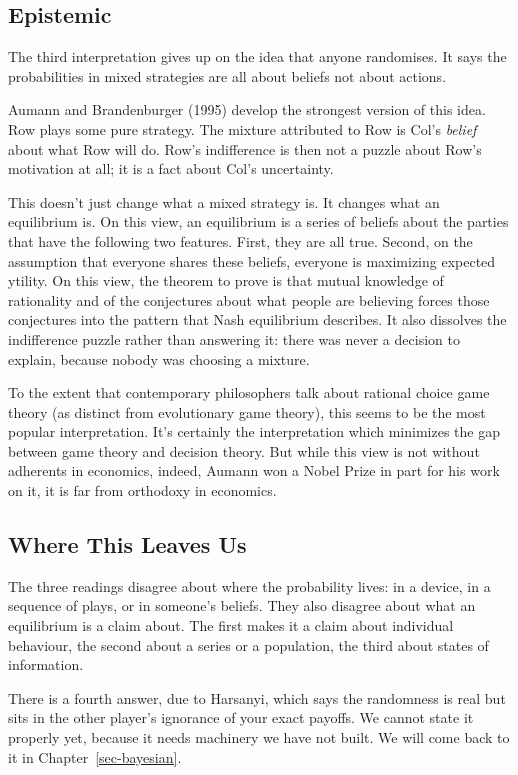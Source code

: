 \documentclass[
  11pt,
  letterpaper,
]{scrbook}
\begin{document}
\subsection{Epistemic}\label{epistemic}

The third interpretation gives up on the idea that anyone randomises. It
says the probabilities in mixed strategies are all about beliefs not
about actions.

Aumann and Brandenburger (1995) develop the strongest version of this
idea. Row plays some pure strategy. The mixture attributed to Row is
Col's \emph{belief} about what Row will do. Row's indifference is then
not a puzzle about Row's motivation at all; it is a fact about Col's
uncertainty.

This doesn't just change what a mixed strategy is. It changes what an
equilibrium is. On this view, an equilibrium is a series of beliefs
about the parties that have the following two features. First, they are
all true. Second, on the assumption that everyone shares these beliefs,
everyone is maximizing expected ytility. On this view, the theorem to
prove is that mutual knowledge of rationality and of the conjectures
about what people are believing forces those conjectures into the
pattern that Nash equilibrium describes. It also dissolves the
indifference puzzle rather than answering it: there was never a decision
to explain, because nobody was choosing a mixture.

To the extent that contemporary philosophers talk about rational choice
game theory (as distinct from evolutionary game theory), this seems to
be the most popular interpretation. It's certainly the interpretation
which minimizes the gap between game theory and decision theory. But
while this view is not without adherents in economics, indeed, Aumann
won a Nobel Prize in part for his work on it, it is far from orthodoxy
in economics.

\subsection{Where This Leaves Us}\label{where-this-leaves-us}

The three readings disagree about where the probability lives: in a
device, in a sequence of plays, or in someone's beliefs. They also
disagree about what an equilibrium is a claim about. The first makes it
a claim about individual behaviour, the second about a series or a
population, the third about states of information.

There is a fourth answer, due to Harsanyi, which says the randomness is
real but sits in the other player's ignorance of your exact payoffs. We
cannot state it properly yet, because it needs machinery we have not
built. We will come back to it in Chapter~\ref{sec-bayesian}.
\end{document}
